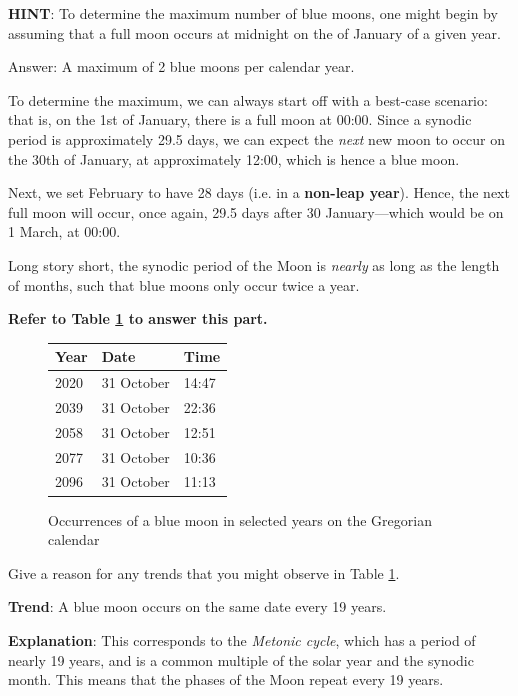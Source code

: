 \documentclass[a4paper,11pt,draft]{exam}
\begin{document}
\begin{questions}
	\textbf{HINT}: To determine the maximum number of blue moons, one might begin by assuming that a full moon occurs at midnight on the  of January of a given year.
	\droppoints
	\begin{solution}
		Answer: A maximum of 2 blue moons per calendar year.
		
		To determine the maximum, we can always start off with a best-case scenario: that is, on the 1st of January, there is a full moon at 00:00. Since a synodic period is approximately 29.5 days, we can expect the \textit{next} new moon to occur on the 30th of January, at approximately 12:00, which is hence a blue moon.
		
		Next, we set February to have 28 days (i.e. in a \textbf{non-leap year}). Hence, the next full moon will occur, once again, 29.5 days after 30 January---which would be on 1 March, at 00:00.
		
		Long story short, the synodic period of the Moon is \textit{nearly} as long as the length of months, such that blue moons only occur twice a year. 
	\end{solution}

\setcounter{question}{12}	
\question[2]
	\textbf{Refer to Table \ref{q3m} to answer this part.}
	\begin{figure}[H]
		\centering
		\begin{tabularx}{0.3\textwidth}{@{}lXl@{}}
			\toprule
			\textbf{Year} & \textbf{Date}    & \textbf{Time}   \\ \midrule
			2020          & 31 October & 14:47  \\
			2039          & 31 October & 22:36  \\
			2058          & 31 October & 12:51  \\
			2077          & 31 October & 10:36  \\
			2096          & 31 October & 11:13  \\ \bottomrule
		\end{tabularx}
		\renewcommand{\figurename}{Table}
		\caption{Occurrences of a blue moon in selected years on the Gregorian calendar}
		\label{q3m}
		\vspace*{-10pt}
	\end{figure}
	Give a reason for any trends that you might observe in Table \ref{q3m}.	
	\droppoints
	\begin{solution}
		\textbf{Trend}: A blue moon occurs on the same date every 19 years. 
		
		\textbf{Explanation}: This corresponds to the \textit{Metonic cycle}, which has a period of nearly 19 years, and is a common multiple of the solar year and the synodic month. This means that the phases of the Moon repeat every 19 years.
	\end{solution}
\end{questions}
\newpage
\end{document}
